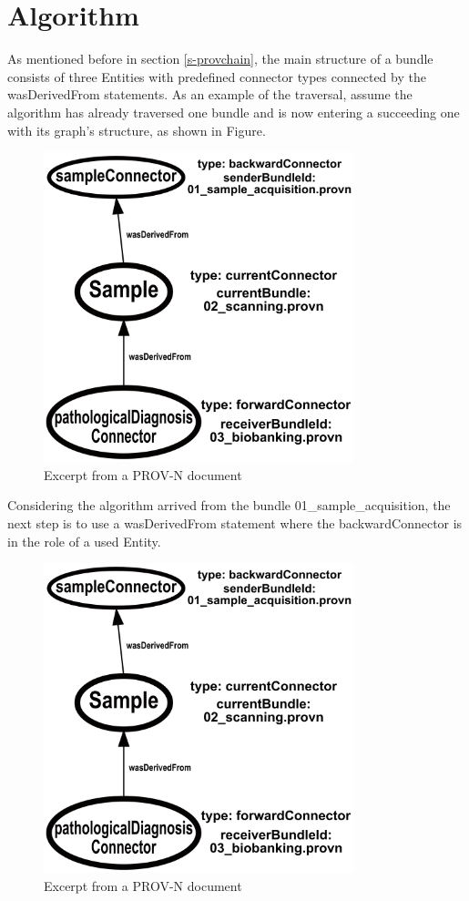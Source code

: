 \documentclass[
  digital,     %
  oneside,     %
  nosansbold,  %
  nocolorbold, %
  lof,         %
  lot,         %
]{fithesis4}
\begin{document}
\section{Algorithm}
\shorthandoff{-}
As mentioned before in section \ref{s-provchain}, the main structure of a bundle consists of three Entities with predefined connector types connected by the wasDerivedFrom statements. As an example of the traversal, assume the algorithm has already traversed one bundle and is now entering a succeeding one with its graph's structure, as shown in Figure.

\begin{figure}[htbp]
  \begin{center}
    \includegraphics[width=9cm]{fithesis/images/examplebigger.png}
  \end{center}
  \caption{Excerpt from a PROV-N document}
  \label{fig:bundleexample}
\end{figure}
\shorthandon{-}

Considering the algorithm arrived from the bundle 01\_sample\_acquisition,
the next step is to use a wasDerivedFrom statement where the
backwardConnector is in the role of a used Entity.

\begin{figure}[htbp]
  \begin{center}
    \includegraphics[width=9cm]{fithesis/images/examplebigger.png}
  \end{center}
  \caption{Excerpt from a PROV-N document}
  \label{fig:bundleexample2}
\end{figure}
\end{document}
